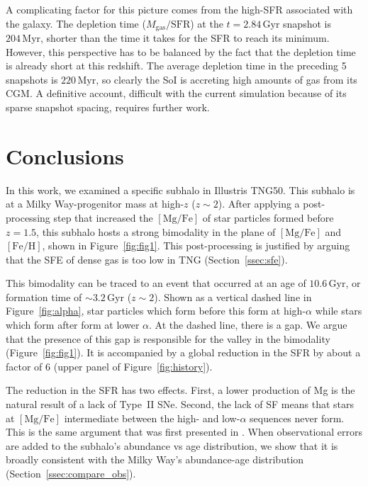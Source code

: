 \documentclass[linenumbers, twocolumn]{aastex631}
\newcommand{\Gyr}{\ensuremath{\textrm{Gyr}}}
\newcommand{\Myr}{\ensuremath{\textrm{Myr}}}
\newcommand{\FeH}{\ensuremath{[\textrm{Fe}/\textrm{H}]}}
\newcommand{\MgFe}{\ensuremath{[\textrm{Mg}/\textrm{Fe}]}}
\begin{document}
A complicating factor for this picture comes from the high-SFR associated with the galaxy. The depletion time ($M_{\textrm{gas}}/\textrm{SFR}$) at the $t=2.84\,\Gyr$ snapshot is $204\,\Myr$, shorter than the time it takes for the SFR to reach its minimum. However, this perspective has to be balanced by the fact that the depletion time is already short at this redshift. The average depletion time in the preceding 5 snapshots is $220\,\Myr$, so clearly the SoI is accreting high amounts of gas from its CGM. A definitive account, difficult with the current simulation because of its sparse snapshot spacing, requires further work.


\section{Conclusions}\label{sec:conc}
In this work, we examined a specific subhalo in Illustris TNG50. This subhalo is at a Milky Way-progenitor mass at high-$z$ ($z\sim2$). After applying a post-processing step that increased the \MgFe{} of star particles formed before $z=1.5$, this subhalo hosts a strong bimodality in the plane of \MgFe{} and \FeH{}, shown in Figure~\ref{fig:fig1}. This post-processing is justified by arguing that the SFE of dense gas is too low in TNG (Section~\ref{ssec:sfe}).

This bimodality can be traced to an event that occurred at an age of $10.6\,\Gyr$, or formation time of $\sim3.2\,\Gyr$ ($z\sim2$). Shown as a vertical dashed line in Figure~\ref{fig:alpha}, star particles which form before this form at high-$\alpha$ while stars which form after form at lower $\alpha$. At the dashed line, there is a gap. We argue that the presence of this gap is responsible for the valley in the bimodality (Figure~\ref{fig:fig1}). It is accompanied by a global reduction in the SFR by about a factor of 6 (upper panel of Figure~\ref{fig:history}).

The reduction in the SFR has two effects. First, a lower production of Mg is the natural result of a lack of Type~II SNe. Second, the lack of SF means that stars at \MgFe{} intermediate between the high- and low-$\alpha$ sequences never form. This is the same argument that was first presented in \citet{2024arXiv240707985B}. When observational errors are added to the subhalo's abundance vs age distribution, we show that it is broadly consistent with the Milky Way's abundance-age distribution (Section~\ref{ssec:compare_obs}).
\end{document}
